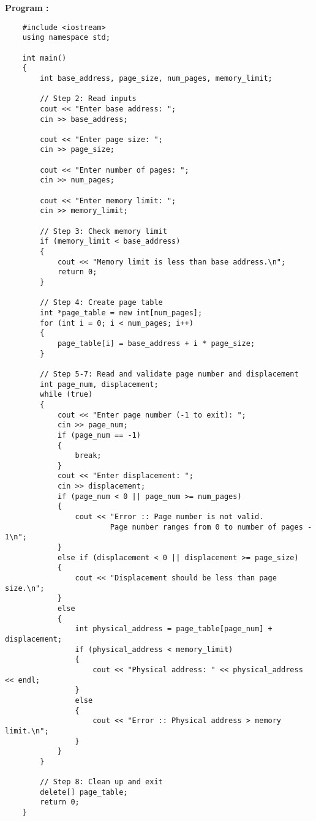 \documentclass[journal,onecolumn]{IEEEtran}
\begin{document}
\textbf{Program : }
\begin{verbatim}
    #include <iostream>
    using namespace std;
    
    int main()
    {
        int base_address, page_size, num_pages, memory_limit;
    
        // Step 2: Read inputs
        cout << "Enter base address: ";
        cin >> base_address;
    
        cout << "Enter page size: ";
        cin >> page_size;
    
        cout << "Enter number of pages: ";
        cin >> num_pages;
    
        cout << "Enter memory limit: ";
        cin >> memory_limit;
    
        // Step 3: Check memory limit
        if (memory_limit < base_address)
        {
            cout << "Memory limit is less than base address.\n";
            return 0;
        }
    
        // Step 4: Create page table
        int *page_table = new int[num_pages];
        for (int i = 0; i < num_pages; i++)
        {
            page_table[i] = base_address + i * page_size;
        }
    
        // Step 5-7: Read and validate page number and displacement
        int page_num, displacement;
        while (true)
        {
            cout << "Enter page number (-1 to exit): ";
            cin >> page_num;
            if (page_num == -1)
            {
                break;
            }
            cout << "Enter displacement: ";
            cin >> displacement;
            if (page_num < 0 || page_num >= num_pages)
            {
                cout << "Error :: Page number is not valid. 
                        Page number ranges from 0 to number of pages - 1\n";
            }
            else if (displacement < 0 || displacement >= page_size)
            {
                cout << "Displacement should be less than page size.\n";
            }
            else
            {
                int physical_address = page_table[page_num] + displacement;
                if (physical_address < memory_limit)
                {
                    cout << "Physical address: " << physical_address << endl;
                }
                else
                {
                    cout << "Error :: Physical address > memory limit.\n";
                }
            }
        }
    
        // Step 8: Clean up and exit
        delete[] page_table;
        return 0;
    }
\end{verbatim}
\end{document}
